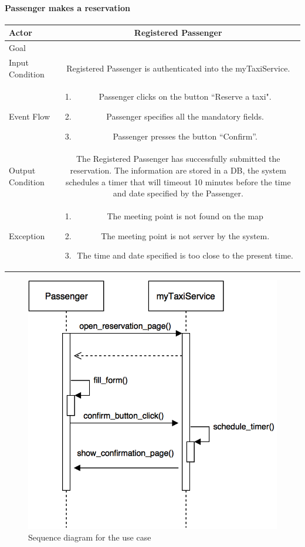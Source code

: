 \documentclass[a4paper,12pt]{article}%
\newcommand{\usecasetable}[6]{
\begin{center}
\def\arraystretch{1.5}
\begin{tabularx}{\textwidth}{|s|C|}
\hline
Actor & #1\\
\hline
Goal & #2\\
\hline
Input Condition & #3 \\
\hline
Event Flow & #4\\
\hline
Output Condition & #5\\
\hline
Exception & #6\\
\hline
\end{tabularx}
\end{center}
}
\begin{document}
\paragraph{Passenger makes a reservation}
\usecasetable {Registered Passenger}{}{Registered Passenger is authenticated into the  myTaxiService.} 
{
\begin{minipage}[b]{11cm}
\begin{enumerate}
\item Passenger clicks on the button ``Reserve a taxi".
\item Passenger specifies all the mandatory fields.
\item Passenger presses the button ``Confirm''.
\end{enumerate}
\end{minipage}
}
{The Registered Passenger has successfully submitted the reservation. The information are stored in a DB, the system schedules a timer that will timeout 10 minutes before the time and date specified by the Passenger.}
{
\begin{minipage}[b]{11cm}
\begin{enumerate}
\item The meeting point is not found on the map
\item The meeting point is not server by the system.
\item The time and date specified is too close to the present time.
\end{enumerate}
\end{minipage}
}
\begin{figure}[H]
\centering
\includegraphics[scale=.3]{make_reservation.png}
\caption{Sequence diagram for the use case}
\end{figure}
\break
\end{document}
